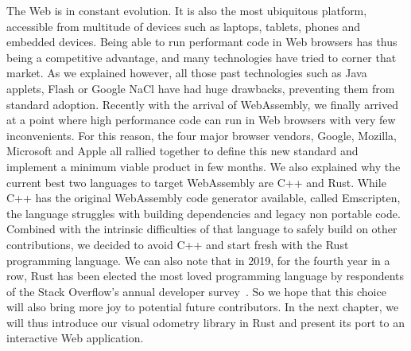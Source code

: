 The Web is in constant evolution.
It is also the most ubiquitous platform, accessible from multitude of devices
such as laptops, tablets, phones and embedded devices.
Being able to run performant code in Web browsers has thus being a competitive advantage,
and many technologies have tried to corner that market.
As we explained however, all those past technologies such as Java applets,
Flash or Google NaCl have had huge drawbacks, preventing them from standard adoption.
Recently with the arrival of WebAssembly, we finally arrived at a point where high performance
code can run in Web browsers with very few inconvenients.
For this reason, the four major browser vendors, Google, Mozilla, Microsoft and Apple
all rallied together to define this new standard and implement a minimum viable product in few months.
We also explained why the current best two languages to target WebAssembly are C++ and Rust.
While C++ has the original WebAssembly code generator available, called Emscripten,
the language struggles with building dependencies and legacy non portable code.
Combined with the intrinsic difficulties of that language to safely build on
other contributions, we decided to avoid C++ and start fresh with the Rust programming language.
We can also note that in 2019, for the fourth year in a row,
Rust has been elected the most loved programming language
by respondents of the Stack Overflow's annual developer survey~\cite{rustlovedso}.
So we hope that this choice will also bring more joy to potential future contributors.
In the next chapter, we will thus introduce our visual odometry library in Rust
and present its port to an interactive Web application.
